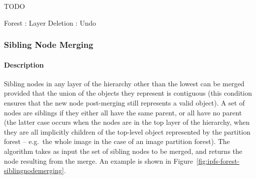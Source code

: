 TODO


\begin{stulisting}[p]
\caption{Forest : Layer Deletion : Undo}
\label{code:ipfs-forest-undeletelayerimpl}

\end{stulisting}

\afterpage{\clearpage}
\newpage

\subsubsection{Sibling Node Merging}

\paragraph{Description}

Sibling nodes in any layer of the hierarchy other than the lowest can be merged provided that the union of the objects they represent is contiguous (this condition ensures that the new node post-merging still represents a valid object). A set of nodes are siblings if they either all have the same parent, or all have no parent (the latter case occurs when the nodes are in the top layer of the hierarchy, when they are all implicitly children of the top-level object represented by the partition forest -- e.g.~the whole image in the case of an image partition forest). The algorithm takes as input the set of sibling nodes to be merged, and returns the node resulting from the merge. An example is shown in Figure~\ref{fig:ipfs-forest-siblingnodemerging}.

